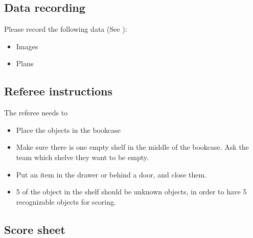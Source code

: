 \subsection{Data recording}
  Please record the following data (See ):
  \begin{itemize}
   \item Images
   \item Plans
  \end{itemize}

\subsection{Referee instructions}

The referee needs to
\begin{itemize}
\item Place the objects in the bookcase
\item Make sure there is one empty shelf in the middle of the bookcase. Ask the team which shelve they want to be empty.
\item Put an item in the drawer or behind a door, and close them.
\item 5 of the object in the shelf should be unknown objects, in order to have 5 recognizable objects for scoring. 
\end{itemize}

\subsection{Score sheet}


